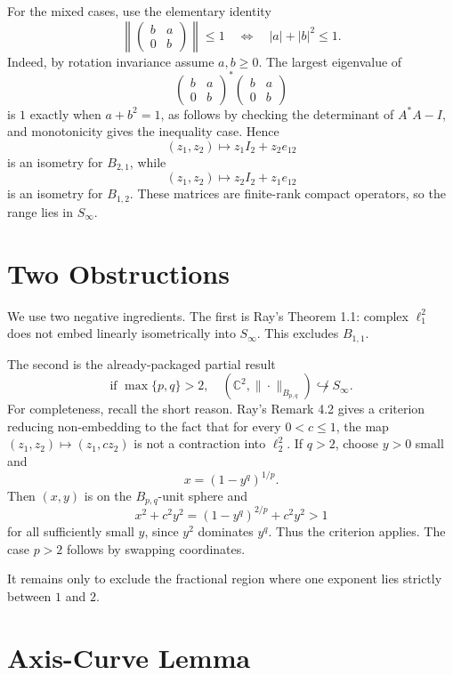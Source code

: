 \documentclass[11pt]{article}
\newcommand{\C}{\mathbb C}
\newcommand{\Sinf}{S_\infty}
\begin{document}
For the mixed cases, use the elementary identity
\[
  \left\|
  \begin{pmatrix} b&a\\0&b\end{pmatrix}
  \right\|\leq 1
  \quad\Longleftrightarrow\quad
  |a|+|b|^2\leq 1.
\]
Indeed, by rotation invariance assume \(a,b\geq0\).  The largest eigenvalue
of
\[
\begin{pmatrix} b&a\\0&b\end{pmatrix}^*
\begin{pmatrix} b&a\\0&b\end{pmatrix}
\]
is \(1\) exactly when \(a+b^2=1\), as follows by checking the determinant of
\(A^*A-I\), and monotonicity gives the inequality case.  Hence
\[
  (z_1,z_2)\longmapsto z_1I_2+z_2e_{12}
\]
is an isometry for \(B_{2,1}\), while
\[
  (z_1,z_2)\longmapsto z_2I_2+z_1e_{12}
\]
is an isometry for \(B_{1,2}\).  These matrices are finite-rank compact
operators, so the range lies in \(\Sinf\).

\section{Two Obstructions}

We use two negative ingredients.  The first is Ray's Theorem 1.1:
complex \(\ell_1^2\) does not embed linearly isometrically into \(\Sinf\).
This excludes \(B_{1,1}\).

The second is the already-packaged partial result
\[
  \text{if } \max\{p,q\}>2,\quad
  (\C^2,\|\cdot\|_{B_{p,q}})\not\hookrightarrow \Sinf.
\]
For completeness, recall the short reason.  Ray's Remark 4.2 gives a
criterion reducing non-embedding to the fact that for every \(0<c\leq1\),
the map \((z_1,z_2)\mapsto(z_1,cz_2)\) is not a contraction into
\(\ell_2^2\).  If \(q>2\), choose \(y>0\) small and
\[
  x=(1-y^q)^{1/p}.
\]
Then \((x,y)\) is on the \(B_{p,q}\)-unit sphere and
\[
  x^2+c^2y^2=(1-y^q)^{2/p}+c^2y^2>1
\]
for all sufficiently small \(y\), since \(y^2\) dominates \(y^q\).  Thus the
criterion applies.  The case \(p>2\) follows by swapping coordinates.

It remains only to exclude the fractional region where one exponent lies
strictly between \(1\) and \(2\).

\section{Axis-Curve Lemma}
\end{document}
